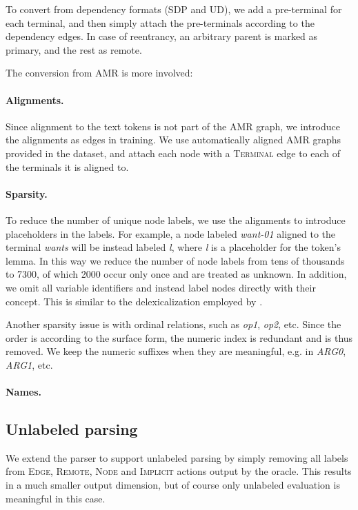 \documentclass[11pt,a4paper]{article}
\begin{document}
To convert from dependency formats (SDP and UD), we add a pre-terminal for each terminal,
and then simply attach the pre-terminals according to the dependency edges.
In case of reentrancy, an arbitrary parent is marked as primary, and the rest as remote.

The conversion from AMR is more involved:

\paragraph{Alignments.}
Since alignment to the text tokens is not part of the AMR graph,
we introduce the alignments as edges in training.
We use automatically aligned AMR graphs provided in the dataset,
and attach each node with a \textsc{Terminal} edge to each of the terminals it is aligned to.

\paragraph{Sparsity.}
To reduce the number of unique node labels, we use the alignments to introduce
placeholders in the labels.
For example, a node labeled \textit{want-01} aligned to the terminal \textit{wants} will
be instead labeled \textit{\textlangle l},
where \textit{\textlangle l\textrangle} is a placeholder for the token's lemma.
In this way we reduce the number of node labels from tens of thousands to 7300,
of which 2000 occur only once and are treated as unknown.
In addition, we omit all variable identifiers and instead label nodes directly with their concept.
This is similar to the delexicalization employed by \citet{buys2017oxford}.

Another sparsity issue is with ordinal relations, such as \textit{op1}, \textit{op2}, etc.
Since the order is according to the surface form, the numeric index is redundant and is thus removed.
We keep the numeric suffixes when they are meaningful, e.g. in \textit{ARG0}, \textit{ARG1}, etc.

\paragraph{Names.}



\subsection{Unlabeled parsing}\label{sec:unlabeled}

We extend the parser to support unlabeled parsing by simply removing all labels from
\textsc{Edge}, \textsc{Remote}, \textsc{Node} and \textsc{Implicit} actions output by the oracle.
This results in a much smaller output dimension, but of course only unlabeled evaluation is
meaningful in this case.
\end{document}
